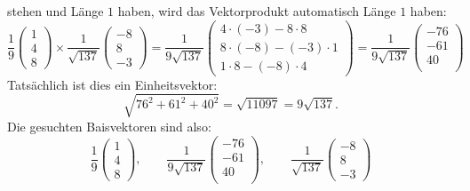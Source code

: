 \begin{loesung}
stehen und Länge $1$ haben, wird das Vektorprodukt automatisch
Länge $1$ haben:
\[
\frac19
\begin{pmatrix}
1\\4\\8
\end{pmatrix}
\times
\frac1{\sqrt{137}}\begin{pmatrix}-8\\8\\-3\end{pmatrix}
=
\frac1{9\sqrt{137}}
\begin{pmatrix}
4\cdot(-3)-8\cdot 8\\
8\cdot(-8)-(-3)\cdot1\\
1\cdot 8-(-8)\cdot 4
\end{pmatrix}
=
\frac1{9\sqrt{137}}
\begin{pmatrix}
-76\\
-61\\
40\\
\end{pmatrix}
\]
Tatsächlich ist dies ein Einheitsvektor:
\[
\sqrt{76^2+61^2+40^2}=\sqrt{11097}=9\sqrt{137}.
\]
Die gesuchten Baisvektoren sind also: 
\[
\frac19
\begin{pmatrix}
1\\4\\8
\end{pmatrix}
,
\qquad
\frac1{9\sqrt{137}}
\begin{pmatrix}
-76\\
-61\\
40\\
\end{pmatrix},
\qquad
\frac1{\sqrt{137}}
\begin{pmatrix}
-8\\
8\\
-3
\end{pmatrix}
\]


\end{loesung}
